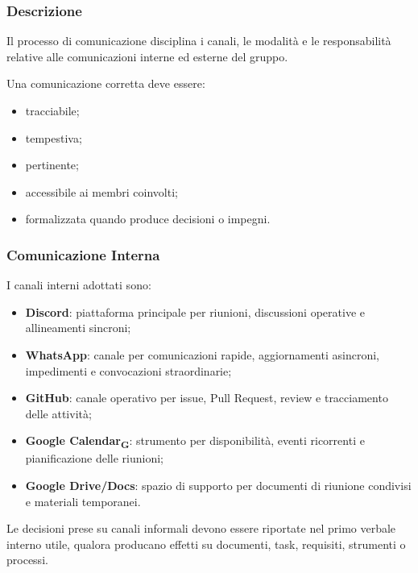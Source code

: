 \subsubsection{Descrizione}

Il processo di comunicazione disciplina i canali, le modalità e le responsabilità
relative alle comunicazioni interne ed esterne del gruppo.

Una comunicazione corretta deve essere:

\begin{itemize}
    \item tracciabile;
    \item tempestiva;
    \item pertinente;
    \item accessibile ai membri coinvolti;
    \item formalizzata quando produce decisioni o impegni.
\end{itemize}


\subsubsection{Comunicazione Interna}

I canali interni adottati sono:

\begin{itemize}
    \item \textbf{Discord}: piattaforma principale per riunioni, discussioni operative
    e allineamenti sincroni;

    \item \textbf{WhatsApp}: canale per comunicazioni rapide, aggiornamenti asincroni,
    impedimenti e convocazioni straordinarie;

    \item \textbf{GitHub}: canale operativo per issue, Pull Request, review e
    tracciamento delle attività;

    \item \textbf{Google Calendar\textsubscript{G}}: strumento per disponibilità, eventi ricorrenti e
    pianificazione delle riunioni;

    \item \textbf{Google Drive/Docs}: spazio di supporto per documenti di riunione
    condivisi e materiali temporanei.
\end{itemize}

Le decisioni prese su canali informali devono essere riportate nel primo verbale
interno utile, qualora producano effetti su documenti, task, requisiti, strumenti
o processi.

